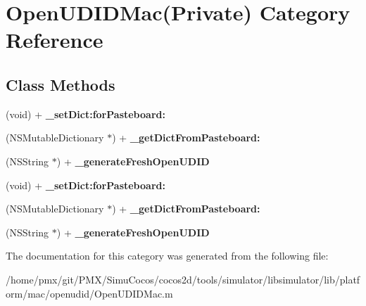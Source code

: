\hypertarget{categoryOpenUDIDMac_07Private_08}{}\section{Open\+U\+D\+I\+D\+Mac(Private) Category Reference}
\label{categoryOpenUDIDMac_07Private_08}
\subsection*{Class Methods}
\begin{DoxyCompactItemize}
\item 
\mbox{\label{categoryOpenUDIDMac_07Private_08_a11b55b80022191759d867665279b43f2}} 
(void) + {\bfseries \+\_\+set\+Dict\+:for\+Pasteboard\+:}
\item 
\mbox{\label{categoryOpenUDIDMac_07Private_08_a7fead9777809118aebbca7857a278c14}} 
(N\+S\+Mutable\+Dictionary $\ast$) + {\bfseries \+\_\+get\+Dict\+From\+Pasteboard\+:}
\item 
\mbox{\label{categoryOpenUDIDMac_07Private_08_aa331e5aea67386a69104fb2c7b14d64f}} 
(N\+S\+String $\ast$) + {\bfseries \+\_\+generate\+Fresh\+Open\+U\+D\+ID}
\item 
\mbox{\label{categoryOpenUDIDMac_07Private_08_a11b55b80022191759d867665279b43f2}} 
(void) + {\bfseries \+\_\+set\+Dict\+:for\+Pasteboard\+:}
\item 
\mbox{\label{categoryOpenUDIDMac_07Private_08_a7fead9777809118aebbca7857a278c14}} 
(N\+S\+Mutable\+Dictionary $\ast$) + {\bfseries \+\_\+get\+Dict\+From\+Pasteboard\+:}
\item 
\mbox{\label{categoryOpenUDIDMac_07Private_08_aa331e5aea67386a69104fb2c7b14d64f}} 
(N\+S\+String $\ast$) + {\bfseries \+\_\+generate\+Fresh\+Open\+U\+D\+ID}
\end{DoxyCompactItemize}


The documentation for this category was generated from the following file\+:\begin{DoxyCompactItemize}
\item 
/home/pmx/git/\+P\+M\+X/\+Simu\+Cocos/cocos2d/tools/simulator/libsimulator/lib/platform/mac/openudid/Open\+U\+D\+I\+D\+Mac.\+m\end{DoxyCompactItemize}
